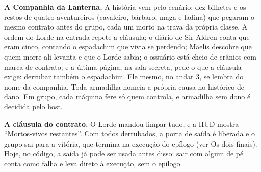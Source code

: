 \documentclass[11pt,a4paper]{article}
\begin{document}
\textbf{A Companhia da Lanterna.} A história vem pelo cenário: dez bilhetes e os restos de quatro aventureiros (cavaleiro, bárbaro, maga e ladina) que pegaram o mesmo contrato antes do grupo, cada um morto na trava da própria classe. A ordem do Lorde na entrada repete a cláusula; o diário de Sir Aldren conta que eram cinco, contando o espadachim que vivia se perdendo; Maelis descobre que quem morre ali levanta e que o Lorde sabia; o ossuário está cheio de crânios com marca de contrato; e a última página, na sala secreta, pede o que a cláusula exige: derrubar também o espadachim. Ele mesmo, no andar 3, se lembra do nome da companhia.
Toda armadilha nomeia a própria causa no histórico de dano. Em grupo, cada máquina fere só quem controla, e armadilha sem dono é decidida pelo host.

\textbf{A cláusula do contrato.} O Lorde mandou limpar tudo, e a HUD mostra ``Mortos-vivos restantes''. Com todos derrubados, a porta de saída é liberada e o grupo sai para a vitória, que termina na execução do epílogo (ver Os dois finais). Hoje, no código, a saída já pode ser usada antes disso: sair com algum de pé conta como falha e leva direto à execução, sem o epílogo.
\end{document}

